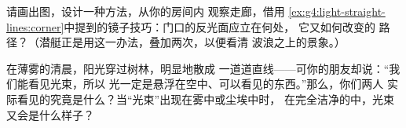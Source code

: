 \begin{exercise}[$\star\star$]\label{exo:g4:light-straight-lines:10}
请画出图，设计一种方法，从你的房间内
观察走廊，借用
\cref{ex:g4:light-straight-lines:corner}中提到的镜子技巧：门口的反光面应立在何处，
它又如何改变的
路径？（潜艇正是用这一办法，叠加两次，以便看清
波浪之上的景象。）
\end{exercise}

\begin{exercise}[$\star\star$]\label{exo:g4:light-straight-lines:11}
在薄雾的清晨，阳光穿过树林，明显地散成
一道道直线——可你的朋友却说：“我们能看见光束，所以
光一定是悬浮在空中、可以看见的东西。”那么，你们两人
实际看见的究竟是什么？当“光束”出现在雾中或尘埃中时，
在完全洁净的中，光束又会是什么样子？
\end{exercise}
